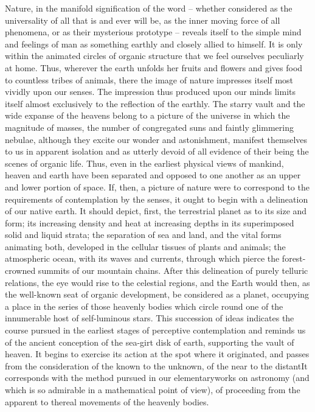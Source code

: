 Nature, in the manifold signification of the word -- whether considered as the universality of all that is and ever will be, as the inner moving force of all phenomena, or as their mysterious prototype -- reveals itself to the simple mind and feelings of man as something earthly and closely allied to himself. It is only within the animated circles of organic structure that we feel ourselves peculiarly at home. Thus, wherever the earth unfolds her fruits and flowers and gives food to countless tribes of animals, there the image of nature impresses itself most vividly upon our senses. The impression thus produced upon our minds limits itself almost exclusively to the reflection of the earthly. The starry vault and the wide expanse of the heavens belong to a picture of the universe in which the magnitude of masses, the number of congregated suns and faintly glimmering nebulae, although they excite our wonder and astonishment, manifest themselves to us in apparent isolation and as utterly devoid of all evidence of their being the scenes of organic life. Thus, even in the earliest physical views of mankind, heaven and earth have been separated and opposed to one another as an upper and lower portion of space. If, then, a picture of nature were to correspond to the requirements of contemplation by the senses, it ought to begin with a delineation of our native earth. It should depict, first, the terrestrial planet as to its size and form; its increasing density and heat at increasing depths in its superimposed solid and liquid strata; the separation of sea and land, and the vital forms animating both, developed in the cellular tissues of plants and animals; the atmospheric ocean, with its waves and currents, through which pierce the forest-crowned summits of our mountain chains. After this delineation of purely telluric relations, the eye would rise to the celestial regions, and the Earth would then, as the well-known seat of organic development, be considered as a planet, occupying a place in the series of those heavenly bodies which circle round one of the innumerable host of self-luminous stars. This succession of ideas indicates the course pursued in the earliest stages of perceptive contemplation and reminds us of the ancient conception of the sea-girt disk of earth, supporting the vault of heaven. It begins to exercise its action at the spot where it originated, and passes from the consideration of the known to the unknown, of the near to the distantIt corresponds with the method pursued in our elementaryworks on astronomy (and which is so admirable in a mathematical point of view), of proceeding from the apparent to thereal movements of the heavenly bodies.
